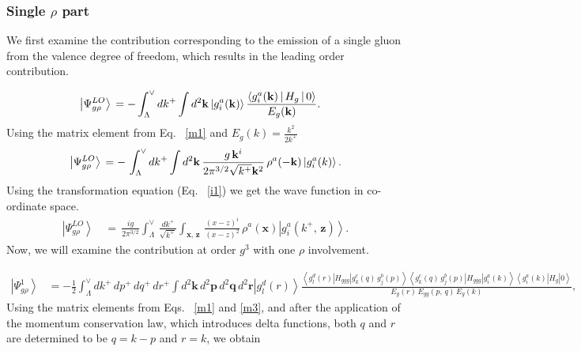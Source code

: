 \documentclass[aps,prd,amsmath,amssymb,nofootinbib]{revtex4-2}
\numberwithin{equation}{section}
\begin{document}
\subsubsection{Single $\rho$ part}
We first examine the contribution corresponding to the emission of a single gluon from the valence degree of freedom, which results in the leading order contribution.
\begin{figure}[h]
\end{figure}
\begin{align}
    \left|\Psi_{g\rho}^{LO}\right\rangle \, & =\- -\int_{\Lambda}^{\vee} dk^{+} \int d^{2}\mathbf{k} \ket{g^{a}_{i}(\mathbf{k})}\frac{\left\langle g_{i}^{a}(\mathbf{k})\left|\, H_{g}\,\right|0\right\rangle}{E_{g}(\mathbf{k})}.
\end{align}
Using the matrix element from Eq.~ \eqref{m1} and $E_{g}(k) = \frac{k^{2}}{2k^{+}}$
\begin{equation}
\left|\Psi_{g\rho}^{LO}\right\rangle \,=\- -\,\int_{\Lambda}^{\vee}dk^{+}\int d^{2}\mathbf{k}\,\frac{g\, \mathbf{k}^{i}}{2\pi^{3/2}\sqrt{k^{+}}\mathbf{k}^{2}}\,\rho^{a}(-\mathbf{k})\left|g_{i}^{a}(k)\right\rangle.
\end{equation}
Using the transformation equation (Eq.~ \eqref{i1}) we get the wave function in co-ordinate space.
\begin{align}\label{lowav}
\left|\Psi_{g\rho}^{LO}\right\rangle \,& =\,\frac{ig}{2\pi^{3/2}}\int_{\Lambda}^{\vee}\,\frac{dk^{+}}{\sqrt{k^{+}}}\int_{\mathbf{x},\, \mathbf{z}}\,\frac{ (x-z)^{i}}{(x-z)^{2}}\,\rho^{a}(\mathbf{x})\left|g_{i}^{a}(k^{+},\, \mathbf{z})\right\rangle .
 \end{align}
Now, we will examine the contribution at order $g^{3}$ with one $\rho$ involvement.
\begin{figure}[h]
\end{figure}
\begin{align}\label{gtwoloop}
\left|\Psi_{g\rho}^{1}\right\rangle & = -\frac{1}{2}\int_{\Lambda}^{\vee}dk^{+}\, dp^{+}\, dq^{+}\, dr^{+}\int d^{2}\mathbf{k}\, d^{2}\mathbf{p}\, d^{2}\mathbf{q}\, d^{2}\mathbf{r} \left|g_{l}^{d}(r)\right\rangle \frac{\left\langle g_{l}^{d}(r)\left|H_{ggg}\right|g_{k}^{c}(q)\, g_{j}^{b}(p)\right\rangle \left\langle g_{k}^{c}(q)\, g_{j}^{b}(p)\left|H_{ggg}\right|g_{i}^{a}(k)\right\rangle \left\langle g_{i}^{a}(k)\left|H_{g}\right|0\right\rangle }{E_{g}(r)\, E_{gg}(p,\, q)\, E_{g}(k)},
\end{align}
Using the matrix elements from Eqs.~ \eqref{m1} and \eqref{m3}, and after the application of the momentum conservation law, which introduces delta functions, both $q$ and $r$ are determined to be $q = k-p$ and $r=k$, we obtain 
\end{document}
